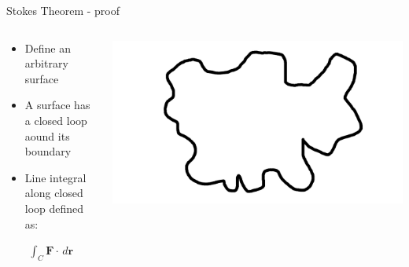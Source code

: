 \documentclass[10pt,aspectratio=169,usenames,dvipsnames]{beamer}
\begin{document}
\begin{frame}{Stokes Theorem - proof}
\begin{columns}
\begin{column}{0.5\textwidth}
\begin{itemize}
    \item Define an arbitrary surface
    \item A surface has a closed loop aound its boundary
    \item Line integral along closed loop defined as:
\end{itemize}
\begin{gather}
    \int_C \textbf{F} \cdot \,d\textbf{r}
\end{gather}
\end{column}
\begin{column}{0.5\textwidth}
\includegraphics[width=0.8\linewidth]{2023StAndrews/surface.png}
\end{column}
\end{columns}
\end{frame}
\end{document}
